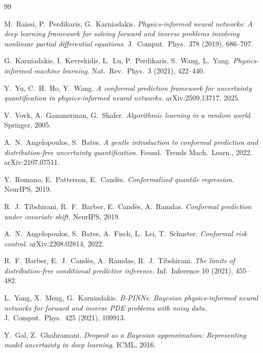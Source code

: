 \documentclass[11pt]{article}
\theoremstyle{definition}
\theoremstyle{remark}
\begin{document}
\begin{thebibliography}{99}\small

 M.\ Raissi, P.\ Perdikaris, G.\ Karniadakis.
\emph{Physics-informed neural networks: A deep learning framework for solving forward and inverse problems involving nonlinear partial differential equations.}
J.\ Comput.\ Phys.\ 378 (2019), 686--707.

 G.\ Karniadakis, I.\ Kevrekidis, L.\ Lu, P.\ Perdikaris, S.\ Wang, L.\ Yang.
\emph{Physics-informed machine learning.}
Nat.\ Rev.\ Phys.\ 3 (2021), 422--440.

 Y.\ Yu, C.~H.\ Ho, Y.\ Wang.
\emph{A conformal prediction framework for uncertainty quantification in physics-informed neural networks.}
arXiv:2509.13717, 2025.

 V.\ Vovk, A.\ Gammerman, G.\ Shafer.
\emph{Algorithmic learning in a random world.}
Springer, 2005.

 A.~N.\ Angelopoulos, S.\ Bates.
\emph{A gentle introduction to conformal prediction and distribution-free uncertainty quantification.}
Found.\ Trends Mach.\ Learn., 2022. arXiv:2107.07511.

 Y.\ Romano, E.\ Patterson, E.\ Cand\`es.
\emph{Conformalized quantile regression.}
NeurIPS, 2019.

 R.~J.\ Tibshirani, R.~F.\ Barber, E.\ Cand\`es, A.\ Ramdas.
\emph{Conformal prediction under covariate shift.}
NeurIPS, 2019.

 A.~N.\ Angelopoulos, S.\ Bates, A.\ Fisch, L.\ Lei, T.\ Schuster.
\emph{Conformal risk control.}
arXiv:2208.02814, 2022.

 R.~F.\ Barber, E.~J.\ Cand\`es, A.\ Ramdas, R.~J.\ Tibshirani.
\emph{The limits of distribution-free conditional predictive inference.}
Inf.\ Inference 10 (2021), 455--482.

 L.\ Yang, X.\ Meng, G.\ Karniadakis.
\emph{B-PINNs: Bayesian physics-informed neural networks for forward and inverse PDE problems with noisy data.}
J.\ Comput.\ Phys.\ 425 (2021), 109913.

 Y.\ Gal, Z.\ Ghahramani.
\emph{Dropout as a Bayesian approximation: Representing model uncertainty in deep learning.}
ICML, 2016.


\end{thebibliography}
\end{document}

